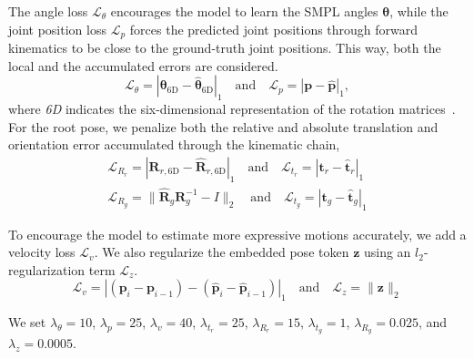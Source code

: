 The angle loss $\mathcal{L}_{\theta}$ encourages the model to learn the SMPL angles $\bm{\theta}$, while the joint position loss $\mathcal{L}_{p}$ forces the predicted joint positions through forward kinematics to be close to the ground-truth joint positions.
This way, both the local and the accumulated errors are considered.
\begin{equation}
    \mathcal{L}_{\theta} = |\bm{\theta}_{\text{6D}}- \bm{\hat{\theta}}_{\text{6D}}|_{1}\quad \textrm{and} \quad \mathcal{L}_{p} = |\bm{p} - \hat{\bm{p}}|_{1},
\end{equation}
where \textit{6D} indicates the six-dimensional representation of the rotation matrices~\cite{zhouContinuityRotationRepresentations2019jun}. 
For the root pose, we penalize both the relative and absolute translation and orientation error accumulated through the kinematic chain, 
\begin{equation}
\begin{split}
    \mathcal{L}_{R_{r}} = |\bm{R}_{r, \text{6D}} - \bm{\hat{R}}_{r, \text{6D}}|_{1}\quad \textrm{and} \quad \mathcal{L}_{t_{r}} = |\bm{t}_{r} - \bm{\hat{t}}_{r}|_{1} \\
    \mathcal{L}_{R_{g}} = \lVert \hat{\bm{R}}_g\bm{R}^{-1}_{g} - I \rVert_{2} \quad \textrm{and} \quad \mathcal{L}_{t_{g}} = |\bm{t}_{g} - \hat{\bm{t}}_{g}|_{1}
\end{split}
\end{equation}

To encourage the model to estimate more expressive motions accurately, we add a velocity loss $\mathcal{L}_{v}$.
We also regularize the embedded pose token $\bm{z}$ using an $l_2$-regularization term $\mathcal{L}_{z}$.
\begin{equation}
    \mathcal{L}_v = | (\bm{p}_i - \bm{p}_{i-1}) - (\hat{\bm{p}}_i - \hat{\bm{p}}_{i-1})|_1 \quad \text{and} \quad \mathcal{L}_{z} = \lVert \bm{z}\rVert_{2}
\end{equation}

We set $\lambda_{\theta}=10$,  $\lambda_{p}=25$,  $\lambda_{v}=40$,  $\lambda_{t_r}=25$, $\lambda_{R_r}=15$, $\lambda_{t_g}=1$, $\lambda_{R_g}=0.025$, and $\lambda_{z}=0.0005$.